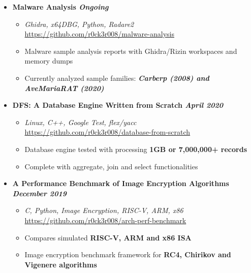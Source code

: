 \documentclass[9]{Resume}
\begin{document}
\begin{itemize}[noitemsep,nolistsep]
    \item[]\textbf{Malware Analysis \hfill \textit{Ongoing}}
        \begin{itemize}[leftmargin=*]
            \setlength\itemsep{-0.25em}
            \item[\textbullet]\textit{Ghidra, x64DBG, Python, Radare2} \hfill \href{https://github.com/r0ck3r008/malware-analysis}{{\scriptsize https://github.com/r0ck3r008/malware-analysis}}
            \item[\textbullet]Malware sample analysis reports with Ghidra/Rizin workspaces and memory dumps
            \item[\textbullet]Currently analyzed sample families: \textbf{\textit{Carberp (2008) and AveMariaRAT (2020)}}
        \end{itemize}

    \item[]\textbf{DFS: A Database Engine Written from Scratch \hfill \textit{April 2020}}
        \begin{itemize}[leftmargin=*]
            \setlength\itemsep{-0.25em}
            \item[\textbullet]\textit{Linux, C++, Google Test, flex/yacc} \hfill \href{https://github.com/r0ck3r008/database-from-scratch}{{\scriptsize https://github.com/r0ck3r008/database-from-scratch}}
            \item[\textbullet]Database engine tested with processing \textbf{1GB or 7,000,000+ records}
            \item[\textbullet]Complete with aggregate, join and select functionalities
        \end{itemize}

    \item[]\textbf{A Performance Benchmark of Image Encryption Algorithms \hfill \textit{December 2019}}
        \begin{itemize}[leftmargin=*]
            \setlength\itemsep{-0.25em}
            \item[\textbullet]\textit{C, Python, Image Encryption, RISC-V, ARM, x86} \hfill \href{https://github.com/r0ck3r008/arch-perf-benchmark}{{\scriptsize https://github.com/r0ck3r008/arch-perf-benchmark}}
            \item[\textbullet]Compares simulated \textbf{RISC-V, ARM and x86 ISA}
            \item[\textbullet]Image encryption benchmark framework for \textbf{RC4, Chirikov and Vigenere algorithms}
        \end{itemize}


\end{itemize}
\end{document}
